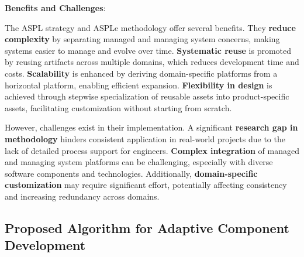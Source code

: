 \documentclass[a4paper,10pt]{article}
\begin{document}
\textbf{Benefits and Challenges}:

The ASPL strategy and ASPLe methodology offer several benefits. They \textbf{reduce complexity} by separating managed and managing system concerns, making systems easier to manage and evolve over time. \textbf{Systematic reuse} is promoted by reusing artifacts across multiple domains, which reduces development time and costs. \textbf{Scalability} is enhanced by deriving domain-specific platforms from a horizontal platform, enabling efficient expansion. \textbf{Flexibility in design} is achieved through stepwise specialization of reusable assets into product-specific assets, facilitating customization without starting from scratch.

However, challenges exist in their implementation. A significant \textbf{research gap in methodology} hinders consistent application in real-world projects due to the lack of detailed process support for engineers. \textbf{Complex integration} of managed and managing system platforms can be challenging, especially with diverse software components and technologies. Additionally, \textbf{domain-specific customization} may require significant effort, potentially affecting consistency and increasing redundancy across domains.





\subsection{Proposed Algorithm for Adaptive Component Development}
\end{document}
